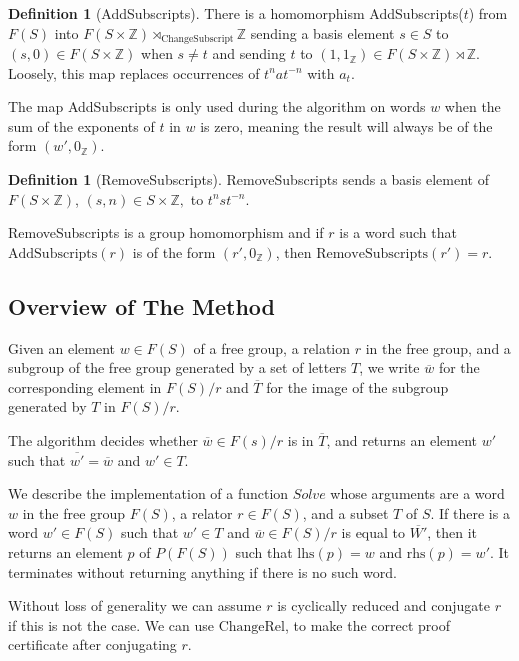 \documentclass[11pt]{article} %
\theoremstyle{definition}
\theoremstyle{definition}
\theoremstyle{definition}
\theoremstyle{definition}
\theoremstyle{definition}
\newtheorem{defn}[theorem]{Definition}
\theoremstyle{definition}
\begin{document}
\begin{defn}[AddSubscripts]\label{AddSubscripts}
  There is a homomorphism AddSubscripts($t$) from $F(S)$ into $F(S \times \mathbb{Z})
  \rtimes_{\text{ChangeSubscript}} \mathbb{Z}$ sending a basis element $s \in S$ to
  $(s, 0) \in F(S \times \mathbb{Z})$ when $s \ne t$ and sending $t$ to
  $(1, 1_\mathbb{Z}) \in F(S \times \mathbb{Z}) \rtimes \mathbb{Z}$. Loosely, this map
  replaces occurrences of $t^n a t^{-n}$ with $a_t$.
\end{defn}

The map AddSubscripts is only used during the algorithm on words $w$ when the sum of the
exponents of $t$ in $w$ is zero, meaning the result will always be of the form
$(w', 0_{\mathbb{Z}})$.

\begin{defn}[RemoveSubscripts]
  RemoveSubscripts sends a basis element of $F(S\times \mathbb{Z})$,  $(s, n) \in S\times \mathbb{Z},$
  to $t^n s t^{-n}$.
\end{defn}
RemoveSubscripts is a group homomorphism and if $r$ is a word such that $\text{AddSubscripts}(r)$ is of the form $(r', 0_\mathbb{Z})$,
then $\text{RemoveSubscripts}(r')=r$.

\subsection{Overview of The Method}

Given an element $w \in F(S)$ of a free group, a relation $r$ in the free group, and a subgroup of the free group
generated by a set of letters $T$,
we write $\overline {w}$ for the corresponding element in $F(S) / r$
and $\overline{T}$ for the image of the subgroup generated by $T$ in $F(S)/r$.

The algorithm decides whether $\overline{w} \in F(s) / r$ is in $\overline{T}$,
and returns an element $w'$ such that $\overline{w'} = \overline{w}$ and $w' \in T$.

We describe the implementation of a function $\textit{Solve}$ whose arguments are a word $w$
in the free group $F(S)$, a relator $r \in F(S)$,
and a subset $T$ of $S$. If there is a word $w' \in F(S)$
such that $w' \in T$ and $\overline{w} \in F(S) / r$ is
equal to $\overline{W'}$, then it returns an element $p$ of $P(F(S))$
such that $\text{lhs}(p) = w$ and $\text{rhs}(p) = w'$. It terminates
without returning anything if there is no such word.

Without loss of generality we can assume $r$ is cyclically reduced and
conjugate $r$ if this is not the case. We can use $\text{ChangeRel}$,
to make the correct proof certificate after conjugating $r$.
\end{document}
